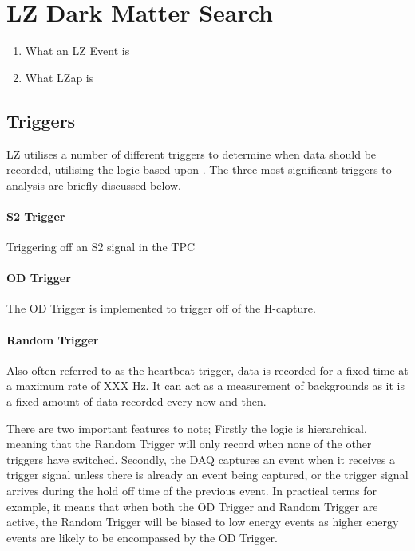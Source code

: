 \section{LZ Dark Matter Search}
\begin{enumerate}
    \item What an LZ Event is
    \item What LZap is
\end{enumerate}

\subsection{Triggers}
\par
LZ utilises a number of different triggers to determine when data should be recorded, utilising the logic based upon \cite{lux_trigger_logic_ref}.
The three most significant triggers to analysis are briefly discussed below.


\paragraph{S2 Trigger}
\par
Triggering off an S2 signal in the TPC

\paragraph{OD Trigger}
\par
The OD Trigger is implemented to trigger off of the H-capture.


\paragraph{Random Trigger}
Also often referred to as the heartbeat trigger, data is recorded for a fixed time at a maximum rate of XXX Hz.
It can act as a measurement of backgrounds as it is a fixed amount of data recorded every now and then.


\par
There are two important features to note;
Firstly the logic is hierarchical, meaning that the Random Trigger will only record when none of the other triggers have switched.
Secondly, the DAQ captures an event when it receives a trigger signal unless there is already an event being captured, or the trigger signal arrives during the hold off time of the previous event.
In practical terms for example, it means that when both the OD Trigger and Random Trigger are active, the Random Trigger will be biased to low energy events as higher energy events are likely to be encompassed by the OD Trigger.